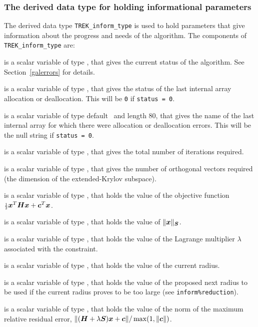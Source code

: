 \documentclass{galahad}
\newcommand{\packagename}{TREK}
\begin{document}

\subsubsection{The derived data type for holding informational
 parameters}\label{typeinform}
The derived data type
{\tt \packagename\_inform\_type}
is used to hold parameters that give information about the progress and needs
of the algorithm. The components of
{\tt \packagename\_inform\_type}
are:

\begin{description}
 is a scalar variable of type \integer, that gives the
current status of the algorithm. See Section~\ref{galerrors} for details.

 is a scalar variable of type \integer,
that gives the status of the last internal array allocation
or deallocation. This will be {\tt 0} if {\tt status = 0}.

 is a scalar variable of type default \character\
and length 80, that  gives the name of the last internal array
for which there were allocation or deallocation errors.
This will be the null string if {\tt status = 0}.

 is a scalar variable of type \integer, that gives the
total number of iterations required.

 is a scalar variable of type \integer, that gives the
number of orthogonal vectors required (the dimension of the extended-Krylov
subspace).

 is a scalar variable of type \realdp, that holds the
value of the objective function ${\scriptstyle \frac{1}{2}} {\bm{x}}^T {\bm{H}} {\bm{x}}  +  {\bm{c}}^T {\bm{x}}$.

 is a scalar variable of type \realdp,
that holds the value of $\|{\bm{x}}\|_{{\bm{S}}}$.

 is a scalar variable of type \realdp, that holds the
value of the Lagrange multiplier $\lambda$ associated with the constraint.

 is a scalar variable of type \realdp, that holds the value of
the current radius.

 is a scalar variable of type \realdp, that holds the value 
of the proposed next radius to be used if the current radius proves to be
too large (see {\tt inform\%reduction}).

 is a scalar variable of type \realdp, that holds the value 
of the norm of the maximum relative residual error, 
$\|({\bm{H}}+\lambda{\bm{S}}) {\bm{x}} + {\bm{c}}\|/\max(1,\|{\bm{c}}\|)$.


\end{description}
\end{document}
